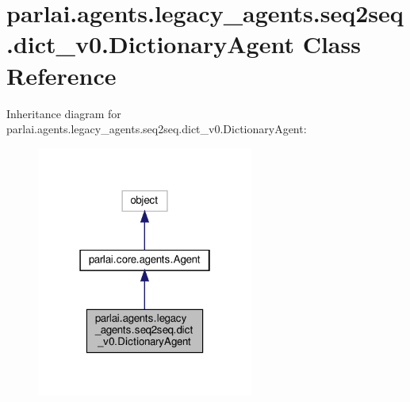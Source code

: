 \hypertarget{classparlai_1_1agents_1_1legacy__agents_1_1seq2seq_1_1dict__v0_1_1DictionaryAgent}{}\section{parlai.\+agents.\+legacy\+\_\+agents.\+seq2seq.\+dict\+\_\+v0.\+Dictionary\+Agent Class Reference}
\label{classparlai_1_1agents_1_1legacy__agents_1_1seq2seq_1_1dict__v0_1_1DictionaryAgent}


Inheritance diagram for parlai.\+agents.\+legacy\+\_\+agents.\+seq2seq.\+dict\+\_\+v0.\+Dictionary\+Agent\+:
\nopagebreak
\begin{figure}[H]
\begin{center}
\leavevmode
\includegraphics[width=202pt]{d3/d78/classparlai_1_1agents_1_1legacy__agents_1_1seq2seq_1_1dict__v0_1_1DictionaryAgent__inherit__graph}
\end{center}
\end{figure}


